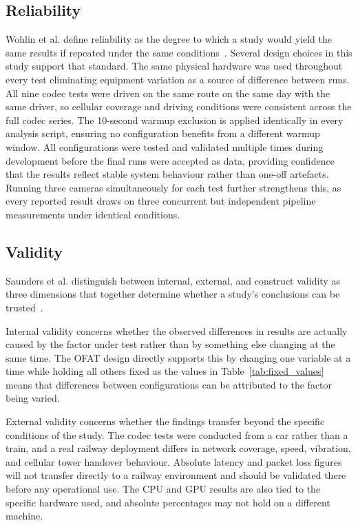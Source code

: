 \subsection{Reliability}

Wohlin et al. define reliability as the degree to which a study would yield the same results if repeated under the same conditions~\cite{wohlin2012}. Several design choices in this study support that standard. The same physical hardware was used throughout every test eliminating equipment variation as a source of difference between runs. All nine codec tests were driven on the same route on the same day with the same driver, so cellular coverage and driving conditions were consistent across the full codec series. The 10-second warmup exclusion is applied identically in every analysis script, ensuring no configuration benefits from a different warmup window. All configurations were tested and validated multiple times during development before the final runs were accepted as data, providing confidence that the results reflect stable system behaviour rather than one-off artefacts. Running three cameras simultaneously for each test further strengthens this, as every reported result draws on three concurrent but independent pipeline measurements under identical conditions.

\subsection{Validity}

Saunders et al. distinguish between internal, external, and construct validity as three dimensions that together determine whether a study's conclusions can be trusted~\cite{saunders2019}.

Internal validity concerns whether the observed differences in results are actually caused by the factor under test rather than by something else changing at the same time. The OFAT design directly supports this by changing one variable at a time while holding all others fixed as the values in Table~\ref{tab:fixed_values} means that differences between configurations can be attributed to the factor being varied.

External validity concerns whether the findings transfer beyond the specific conditions of the study. The codec tests were conducted from a car rather than a train, and a real railway deployment differs in network coverage, speed, vibration, and cellular tower handover behaviour. Absolute latency and packet loss figures will not transfer directly to a railway environment and should be validated there before any operational use. The CPU and GPU results are also tied to the specific hardware used, and absolute percentages may not hold on a different machine.

